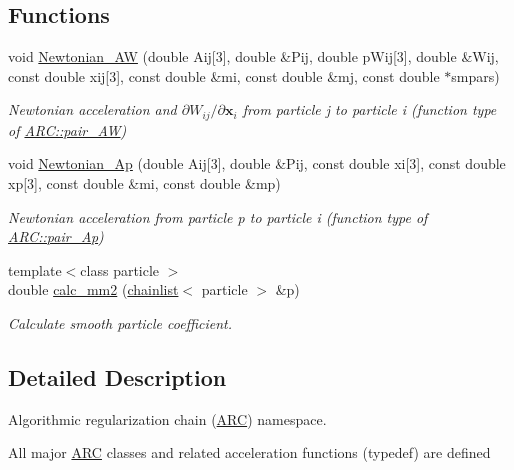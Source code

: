 \subsection*{Functions}
\begin{DoxyCompactItemize}
\item 
void \hyperlink{namespaceARC_ab9fc6518902e918927d8c6bd3d51401d}{Newtonian\+\_\+\+AW} (double Aij\mbox{[}3\mbox{]}, double \&Pij, double p\+Wij\mbox{[}3\mbox{]}, double \&Wij, const double xij\mbox{[}3\mbox{]}, const double \&mi, const double \&mj, const double $\ast$smpars)
\begin{DoxyCompactList}\small\item\em Newtonian acceleration and $\partial W_{ij}/\partial \mathbf{x}_i$ from particle j to particle i (function type of \hyperlink{namespaceARC_a5c4308ca4a8d0e0ff59fdce30f00274c}{A\+R\+C\+::pair\+\_\+\+AW}) \end{DoxyCompactList}\item 
void \hyperlink{namespaceARC_a1010e9fd74a49633259d623839639d67}{Newtonian\+\_\+\+Ap} (double Aij\mbox{[}3\mbox{]}, double \&Pij, const double xi\mbox{[}3\mbox{]}, const double xp\mbox{[}3\mbox{]}, const double \&mi, const double \&mp)
\begin{DoxyCompactList}\small\item\em Newtonian acceleration from particle p to particle i (function type of \hyperlink{namespaceARC_a819446c4644b3a3af7ef11574d0b55e0}{A\+R\+C\+::pair\+\_\+\+Ap}) \end{DoxyCompactList}\item 
{\footnotesize template$<$class particle $>$ }\\double \hyperlink{namespaceARC_a8d6c876e9d20067d0e8a5c1c4c2c4be6}{calc\+\_\+mm2} (\hyperlink{classARC_1_1chainlist}{chainlist}$<$ particle $>$ \&p)
\begin{DoxyCompactList}\small\item\em Calculate smooth particle coefficient. \end{DoxyCompactList}\end{DoxyCompactItemize}


\subsection{Detailed Description}
Algorithmic regularization chain (\hyperlink{namespaceARC}{A\+RC}) namespace. 

All major \hyperlink{namespaceARC}{A\+RC} classes and related acceleration functions (typedef) are defined 

